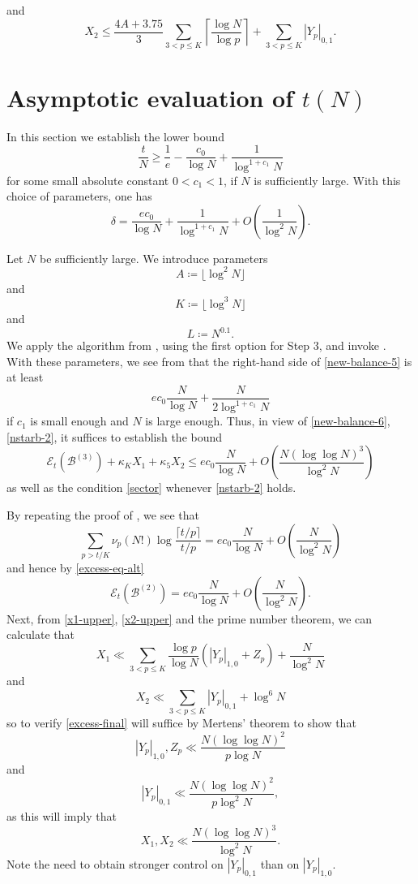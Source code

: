 \documentclass[12pt,a4paper,reqno]{amsart}
\numberwithin{equation}{section}
\theoremstyle{plain}
\theoremstyle{definition}
\newcommand\tuple{{\mathcal B}}
\newcommand\excess{{\mathcal{E}}}
\begin{document}
and
\begin{equation}\label{x2-upper}
  X_2 \leq \frac{4A+3.75}{3} \sum_{3 < p \leq K}  \left\lceil \frac{\log N}{\log p} \right\rceil +
  \sum_{3 <p \leq K}  |Y_p|_{0,1}.
\end{equation}
  

\section{Asymptotic evaluation of \texorpdfstring{$t(N)$}{t(N)}}

In this section we establish the lower bound
\begin{equation}\label{main-lower}
   \frac{t}{N} \geq \frac{1}{e} - \frac{c_0}{\log N} + \frac{1}{\log^{1+c_1} N}
\end{equation}
for some small absolute constant $0 < c_1 < 1$, if $N$ is sufficiently large.  With this choice of parameters, one has
$$ \delta = \frac{ec_0}{\log N} + \frac{1}{\log^{1+c_1} N} + O\left( \frac{1}{\log^2 N} \right).$$

Let $N$ be sufficiently large.  We introduce parameters
$$ A \coloneqq \lfloor \log^2 N \rfloor$$
and
$$ K \coloneqq \lfloor \log^3 N \rfloor$$
and
$$ L \coloneqq N^{0.1}.$$
We apply the algorithm from , using the first option for Step 3, and invoke .  With these parameters, we see from  that the right-hand side of \eqref{new-balance-5} is at least
$$ ec_0 \frac{N}{\log N} + \frac{N}{2 \log^{1+c_1} N}$$
if $c_1$ is small enough and $N$ is large enough.  Thus, in view of \eqref{new-balance-6}, \eqref{nstarb-2}, it suffices to establish the bound
\begin{equation}\label{excess-final} 
  \excess_t(\tuple^{(3)})
+ \kappa_K X_1 + \kappa_5 X_2 \leq ec_0 \frac{N}{\log N} +
O\left( \frac{N (\log\log N)^3}{\log^2 N} \right)
\end{equation}
as well as the condition 
\eqref{sector} whenever \eqref{nstarb-2} holds.

By repeating the proof of , we see that
$$ \sum_{p > t/K} \nu_p(N!) \log \frac{\lceil t/p \rceil}{t/p} = ec_0 \frac{N}{\log N} + O\left( \frac{N}{\log^2 N} \right)$$
and hence by \eqref{excess-eq-alt}
$$ \excess_t(\tuple^{(2)}) = ec_0 \frac{N}{\log N} + O\left( \frac{N}{\log^2 N} \right).$$
Next, from \eqref{x1-upper}, \eqref{x2-upper} and the prime number theorem, we can calculate that
$$ X_1 \ll \sum_{3 < p \leq K} \frac{\log p}{\log N} (|Y_p|_{1,0} + Z_p) + \frac{N}{\log^2 N}$$
and
$$ X_2 \ll \sum_{3 < p \leq K} |Y_p|_{0,1} + \log^6 N$$
so to verify \eqref{excess-final} will suffice by Mertens' theorem to show that
\begin{equation}\label{yp}  
  |Y_p|_{1,0}, Z_p \ll \frac{N (\log\log N)^2}{p \log N}
\end{equation}
and
\begin{equation}\label{yp-neg} 
  |Y_p|_{0,1}  \ll\frac{N (\log\log N)^2}{p \log^2 N},
\end{equation}
as this will imply that
\begin{equation}\label{xb} X_1, X_2 \ll \frac{N (\log\log N)^3}{\log^2 N}.\end{equation}
Note the need to obtain stronger control on $|Y_p|_{0,1}$ than on $|Y_p|_{1,0}$.
\end{document}
